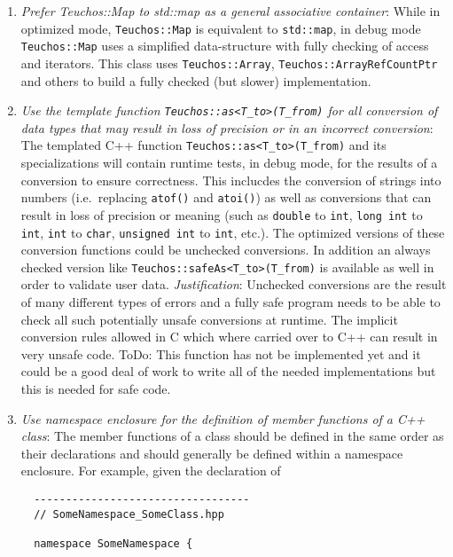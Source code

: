 \begin{enumerate}
{}\item\textit{Prefer Teuchos::Map to std::map as a general associative
container}: While in optimized mode, {}\texttt{Teuchos\-::Map} is equivalent
to {}\texttt{std\-::map}, in debug mode {}\texttt{Teuchos\-::Map} uses a
simplified data-structure with fully checking of access and iterators.  This
class uses {}\texttt{Teuchos\-::Array},
{}\texttt{Teuchos\-::Array\-Ref\-Count\-Ptr} and others to build a fully
checked (but slower) implementation.

{}\item\textit{Use the template function
{}\texttt{Teuchos::as<T\_to>(T\_from)} for all conversion of data types that
may result in loss of precision or in an incorrect conversion}: The templated
C++ function {}\texttt{Teuchos::as<T\_to>(T\_from)} and its specializations
will contain runtime tests, in debug mode, for the results of a conversion to
ensure correctness.  This inclucdes the conversion of strings into numbers
(i.e.\ replacing {}\texttt{atof()} and {}\texttt{atoi()}) as well as
conversions that can result in loss of precision or meaning (such as
{}\texttt{double} to {}\texttt{int}, {}\texttt{long int} to {}\texttt{int},
{}\texttt{int} to {}\texttt{char}, {}\texttt{unsigned int} to {}\texttt{int},
etc.).  The optimized versions of these conversion functions could be
unchecked conversions.  In addition an always checked version like
{}\texttt{Teuchos\-::safeAs\-<\-T\_to\->\-(\-T\_from\-)} is available as well
in order to validate user data.  {}\textit{Justification}: Unchecked
conversions are the result of many different types of errors and a fully safe
program needs to be able to check all such potentially unsafe conversions at
runtime.  The implicit conversion rules allowed in C which where carried over
to C++ can result in very unsafe code.  ToDo: This function has not be
implemented yet and it could be a good deal of work to write all of the needed
implementations but this is needed for safe code.

{}\item\textit{Use namespace enclosure for the definition of member functions
of a C++ class}: The member functions of a class should be defined in the same
order as their declarations and should generally be defined within a namespace
enclosure.  For example, given the declaration of

{\small\begin{verbatim}
  ----------------------------------
  // SomeNamespace_SomeClass.hpp

  namespace SomeNamespace {


\end{verbatim}}
\end{enumerate}
